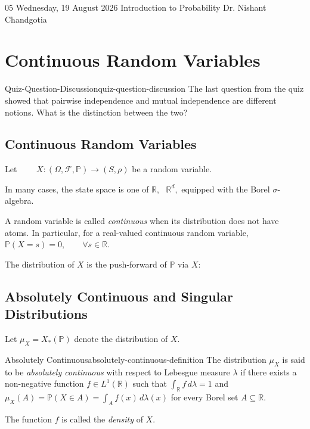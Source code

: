 
\lecture
{05}
{Wednesday, 19 August 2026}
{Introduction to Probability}
{Dr. Nishant Chandgotia}

\section{Continuous Random Variables}


\begin{question}{Quiz-Question-Discussion}{quiz-question-discussion}
The last question from the quiz showed that pairwise independence and
mutual independence are different notions. What is the distinction
between the two?
\end{question}


\subsection{Continuous Random Variables}

Let
\(\qquad 
X:(\Omega,\mathcal{F},\mathbb{P})
\longrightarrow
(S,\rho)
\)
be a random variable.

In many cases, the state space is one of
\(
\mathbb{R}, ~  ~ ~
\mathbb{R}^d,
\)
equipped with the Borel $\sigma$-algebra.

A random variable is called \emph{continuous} when its distribution
does not have atoms. In particular, for a real-valued continuous random
variable,
\(
\mathbb{P}(X=s)=0,
\qquad
\forall s\in\mathbb{R}.
\)

The distribution of $X$ is the push-forward of $\mathbb{P}$ via $X$:

\subsection{Absolutely Continuous and Singular Distributions}

Let $\mu_X=X_*(\mathbb{P})$ denote the distribution of $X$.

\begin{definition}{Absolutely Continuous}{absolutely-continuous-definition}
The distribution $\mu_X$ is said to be \emph{absolutely continuous}
with respect to Lebesgue measure $\lambda$ if there exists a
non-negative function
\(
f\in L^1(\mathbb{R})
\)
such that
\(
\int_{\mathbb{R}}f\,d\lambda=1
\)
and
\(
\mu_X(A)
=
\mathbb{P}(X\in A)
=
\int_A f(x)\,d\lambda(x)
\)
for every Borel set $A\subseteq\mathbb{R}$.

The function $f$ is called the \emph{density} of $X$.
\end{definition}

